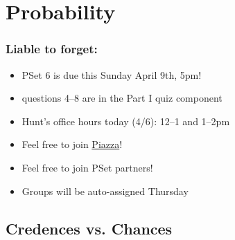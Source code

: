 ﻿%



\setcounter{section}{5} 

\section{Probability}

\begin{frame}

\scriptsize{\tableofcontents}

\end{frame}


\begin{frame}
\frametitle{Liable to forget:}

\begin{itemize}[<+->]

\item PSet 6 is due this Sunday April 9th, 5pm!

\item[] questions 4--8 are in the Part I quiz component %

\item Hunt's office hours today (4/6): 12--1 and 1--2pm



\item Feel free to join \href{https://piazza.com/mit/spring2023/24118}{Piazza}! 

\item Feel free to join PSet partners!
\item[] Groups will be auto-assigned Thursday 


\end{itemize}
\end{frame}

\subsection{Credences vs. Chances}

